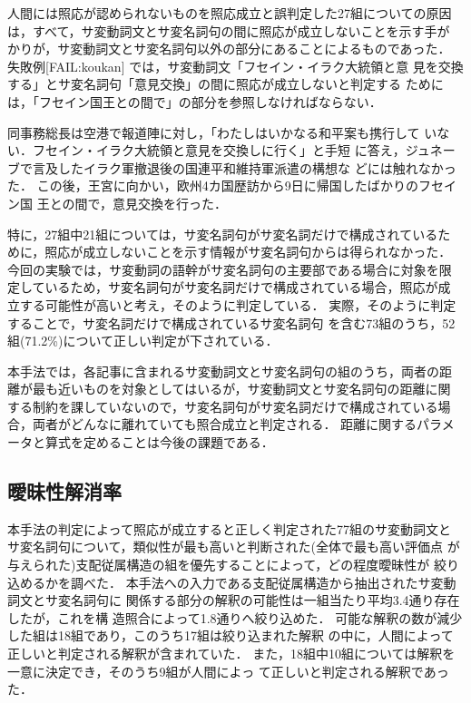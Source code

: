 人間には照応が認められないものを照応成立と誤判定した27組についての原因
は，すべて，サ変動詞文とサ変名詞句の間に照応が成立しないことを示す手が
かりが，サ変動詞文とサ変名詞句以外の部分にあることによるものであった．
失敗例[FAIL:koukan] では，サ変動詞文「フセイン・イラク大統領と意
見を交換する」とサ変名詞句「意見交換」の間に照応が成立しないと判定する
ためには，「フセイン国王との間で」の部分を参照しなければならない． 
\begin{FAIL}
\fail 
同事務総長は空港で報道陣に対し，「わたしはいかなる和平案も携行して
いない．フセイン・イラク大統領と意見を交換しに行く」と手短
に答え，ジュネーブで言及したイラク軍撤退後の国連平和維持軍派遣の構想な
どには触れなかった．
この後，王宮に向かい，欧州4カ国歴訪から9日に帰国したばかりのフセイン国
王との間で，意見交換を行った．
\end{FAIL}
特に，27組中21組については，サ変名詞句がサ変名詞だけで構成されているた
めに，照応が成立しないことを示す情報がサ変名詞句からは得られなかった．
今回の実験では，サ変動詞の語幹がサ変名詞句の主要部である場合に対象を限
定しているため，サ変名詞句がサ変名詞だけで構成されている場合，照応が成
立する可能性が高いと考え，そのように判定している．
実際，そのように判定することで，サ変名詞だけで構成されているサ変名詞句
を含む73組のうち，52組(71.2\%)について正しい判定が下されている．

本手法では，各記事に含まれるサ変動詞文とサ変名詞句の組のうち，両者の距
離が最も近いものを対象としてはいるが，サ変動詞文とサ変名詞句の距離に関
する制約を課していないので，サ変名詞句がサ変名詞だけで構成されている場
合，両者がどんなに離れていても照合成立と判定される．
距離に関するパラメータと算式を定めることは今後の課題である．

\subsection{曖昧性解消率}

本手法の判定によって照応が成立すると正しく判定された77組のサ変動詞文と
サ変名詞句について，類似性が最も高いと判断された(全体で最も高い評価点
が与えられた)支配従属構造の組を優先することによって，どの程度曖昧性が
絞り込めるかを調べた．
本手法への入力である支配従属構造から抽出されたサ変動詞文とサ変名詞句に
関係する部分の解釈の可能性は一組当たり平均3.4通り存在したが，これを構
造照合によって1.8通りへ絞り込めた．
可能な解釈の数が減少した組は18組であり，このうち17組は絞り込まれた解釈
の中に，人間によって正しいと判定される解釈が含まれていた．
また，18組中10組については解釈を一意に決定でき，そのうち9組が人間によっ
て正しいと判定される解釈であった．

